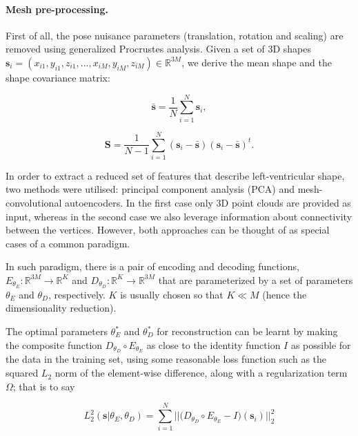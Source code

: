 \documentclass[twocolumn]{llncs}
\begin{document}
\paragraph{Mesh pre-processing.} First of all, the pose nuisance parameters (translation, rotation and scaling) are removed using generalized Procrustes analysis. 
Given a set of 3D shapes %
$\textbf{s}_i=(x_{i1}, y_{i1}, z_{i1}, ..., x_{iM}, y_{iM}, z_{iM})\in \mathbb{R}^{3M}$,
we derive the mean shape and the shape covariance matrix:

\begin{equation}
\bar{\textbf{s}}=\frac{1}{N}\sum_{i=1}^{N}{\textbf{s}}_i,
\end{equation}

\begin{equation}
\textbf{S}=\frac{1}{N-1}\sum_{i=1}^{N}({\textbf{s}}_i-\bar{\textbf{s}})({\textbf{s}}_i-\bar{\textbf{s}})^t.
\end{equation}

In order to extract a reduced set of features that describe left-ventricular shape, two methods were utilised: principal component analysis (PCA) and mesh-convolutional autoencoders. In the first case only 3D point clouds are provided as input, whereas in the second case we also leverage information about connectivity between the vertices. However, both approaches can be thought of as special cases of a common paradigm.

In such paradigm, there is a pair of encoding and decoding functions, $E_{\theta_E}:\mathbb{R}^{3M}\rightarrow\mathbb{R}^{K}$ and $D_{\theta_D}:\mathbb{R}^{K}\rightarrow\mathbb{R}^{3M}$ that are parameterized by a set of parameters $\theta_E$ and $\theta_D$, respectively. $K$ is usually chosen so that $K\ll M$ (hence the dimensionality reduction). 

The optimal parameters $\theta_E^*$ and $\theta_D^*$ for reconstruction can be learnt by making the composite function $D_{\theta_D} \circ E_{\theta_E}$ as close to the identity function $I$ as possible for the data in the training set, using some reasonable loss function such as the squared $L_2$ norm of the element-wise difference, along with a regularization term $\Omega$; that is to say

\begin{equation}
L_2^2(\textbf{s}|\theta_E, \theta_D)=
\sum_{i=1}^{N} \big|\big|\big(D_{\theta_D} \circ E_{\theta_E} - I\big) (\textbf{s}_i) \big|\big|_2^2
\end{equation}
\end{document}
